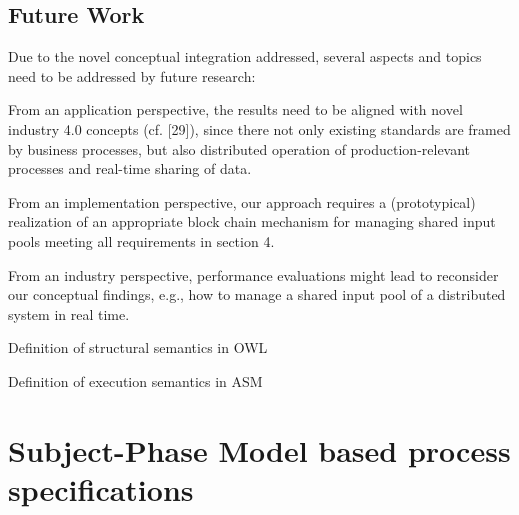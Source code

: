 \subsection{Future Work}
Due to the novel conceptual integration addressed, several aspects and topics need to be addressed by future research:
\begin{list}{-}{spacing}
\item From an application perspective, the results need to be aligned with novel industry 4.0 concepts (cf. [29]), since there not only existing standards are framed by business processes, but also distributed operation of production-relevant processes and real-time sharing of data.
\item From an implementation perspective, our approach requires a (prototypical) realization of an appropriate block chain mechanism for managing shared input pools meeting all requirements in section 4.
\item From an industry perspective, performance evaluations might lead to reconsider our conceptual findings, e.g., how to manage a shared input pool of a distributed system in real time.
\item Definition of structural semantics in OWL
\item Definition of execution semantics in ASM
\end{list}

\section {Subject-Phase Model based process specifications}

